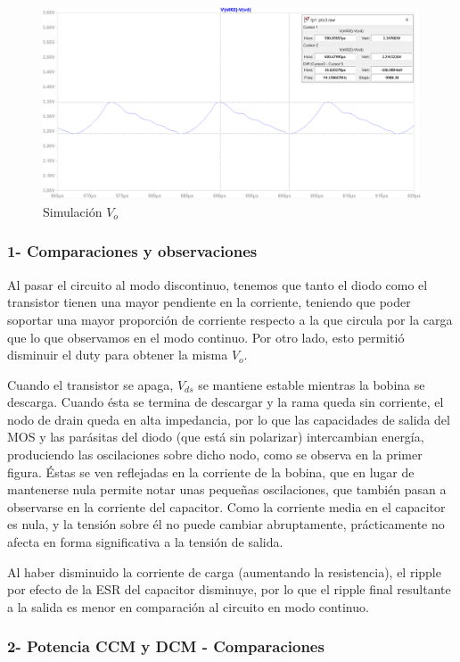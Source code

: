 \documentclass[e4_tp1_main.tex]{subfiles}
\begin{document}
\begin{figure}[H]
\centering
\includegraphics[width=0.9\linewidth]{Imagenes/Punto4/Vo-D=0,35.PNG}
\caption{Simulación $V_o$}
\end{figure}

\subsubsection*{1- Comparaciones y observaciones}

Al pasar el circuito al modo discontinuo, tenemos que tanto el diodo como el transistor tienen una mayor pendiente en la corriente, teniendo que poder soportar una mayor proporción de corriente respecto a la que circula por la carga que lo que observamos en el modo continuo. Por otro lado, esto permitió disminuir el duty para obtener la misma $V_o$.
\par
Cuando el transistor se apaga, $V_{ds}$ se mantiene estable mientras la bobina se descarga. Cuando ésta se termina de descargar y la rama queda sin corriente, el nodo de drain queda en alta impedancia, por lo que las capacidades de salida del MOS y las parásitas del diodo (que está sin polarizar) intercambian energía, produciendo las oscilaciones sobre dicho nodo, como se observa en la primer figura. Éstas se ven reflejadas en la corriente de la bobina, que en lugar de mantenerse nula permite notar unas pequeñas oscilaciones, que también pasan a observarse en la corriente del capacitor. Como la corriente media en el capacitor es nula, y la tensión sobre él no puede cambiar abruptamente, prácticamente no afecta en forma significativa a la tensión de salida.
\par
Al haber disminuido la corriente de carga (aumentando la resistencia), el ripple por efecto de la ESR del capacitor disminuye, por lo que el ripple final resultante a la salida es menor en comparación al circuito en modo continuo.


\subsubsection*{2- Potencia CCM y DCM - Comparaciones}
\end{document}
